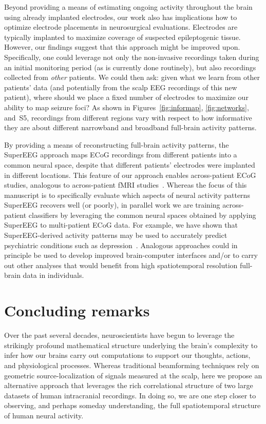 \documentclass[11pt]{article}
\newcommand{\networkpower}{S5}
\begin{document}
Beyond providing a means of estimating ongoing activity throughout the brain
using already implanted electrodes, our work also has implications how to
optimize electrode placements in neurosurgical evaluations. Electrodes are
typically implanted to maximize coverage of suspected epileptogenic tissue.
However, our findings suggest that this approach might be improved upon.
Specifically, one could leverage not only the non-invasive recordings taken
during an initial monitoring period (as is currently done routinely), but also
recordings collected from \textit{other} patients.  We could then ask: given
what we learn from other patients' data (and potentially from the scalp EEG
recordings of this new patient), where should we place a fixed number of
electrodes to maximize our ability to map seizure foci?  As shown in
Figures~\ref{fig:informap}, \ref{fig:networks}, and~\networkpower, recordings
from different regions vary with respect to how informative they are about
different narrowband and broadband full-brain activity patterns.

By providing a means of reconstructing full-brain activity patterns, the
SuperEEG approach maps ECoG recordings from different patients into a common
neural space, despite that different patients' electrodes were implanted in
different locations. This feature of our approach enables across-patient ECoG
studies, analogous to across-patient fMRI studies~\citep[e.g.,][]{HaxbEtal01,
NormEtal06, HaxbEtal11}. Whereas the focus of this manuscript is to specifically
evaluate which aspects of neural activity patterns SuperEEG recovers well (or
poorly), in parallel work we are training across-patient classifiers by
leveraging the common neural spaces obtained by applying SuperEEG to
multi-patient ECoG data.  For example, we have shown that SuperEEG-derived
activity patterns may be used to accurately predict psychiatric conditions such
as depression~\citep{ScanEtal20}.  Analogous approaches could in principle be
used to develop improved brain-computer interfaces and/or to carry out other
analyses that would benefit from high spatiotemporal resolution full-brain data
in individuals.


\section*{Concluding remarks}
Over the past several decades, neuroscientists
have begun to leverage the strikingly profound mathematical structure underlying
the brain's complexity to infer how our brains carry out computations to support
our thoughts, actions, and physiological processes.  Whereas traditional
beamforming techniques rely on geometric source-localization of signals measured
at the scalp, here we propose an alternative approach that leverages the rich
correlational structure of two large datasets of human intracranial recordings.
In doing so, we are one step closer to observing, and perhaps someday
understanding, the full spatiotemporal structure of human neural activity.
\end{document}

